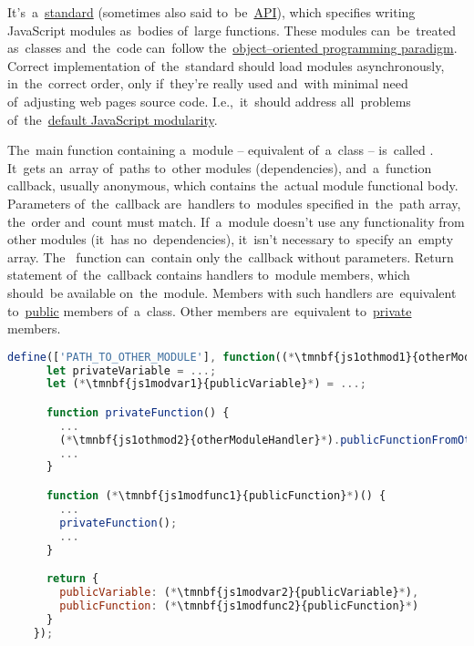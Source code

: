\label{amd}
It's~a~\hyperref[protocolstandard]{standard} (sometimes also said to~be~\hyperref[api]{API}), which specifies writing JavaScript modules as~bodies of~large functions.
These modules can~be~treated as~classes and~the~code can~follow the~\hyperref[objectorientedprogramming]{object--oriented programming paradigm}.
Correct implementation of~the~standard should load modules asynchronously, in~the~correct order, only if~they're really used and~with minimal need of~adjusting web pages source code.
I.e.,~it~should address all~problems of~the~\hyperref[javascriptmodularity]{default JavaScript modularity}.

\enlargethispage{20mm}
\thispagestyle{empty}
\label{amdsyntax}
The~main function containing a~module -- equivalent of~a~class -- is~called .
It~gets an~array of~paths to~other modules (dependencies), and~a~function callback, usually anonymous, which contains the~actual module functional body.
Parameters of~the~callback are~handlers to~modules specified in~the~path array, the~order and~count must match.
If~a~module doesn't use any functionality from other modules (it~has no~dependencies), it~isn't necessary to~specify an~empty array.
The~ function can~contain only the~callback without parameters.
Return statement of~the~callback contains handlers to~module members, which should~be available on~the~module.
Members with such handlers are~equivalent to~\hyperref[javapublic]{public} members of~a~class.
Other members are~equivalent to~\hyperref[javaprivate]{private} members.
\newpage

\begin{lstlisting}[language=JavaScript]
    define(['PATH_TO_OTHER_MODULE'], function((*\tmnbf{js1othmod1}{otherModuleHandler}*)) {
      let privateVariable = ...;
      let (*\tmnbf{js1modvar1}{publicVariable}*) = ...;

      function privateFunction() {
        ...
        (*\tmnbf{js1othmod2}{otherModuleHandler}*).publicFunctionFromOtherModule();
        ...
      }

      function (*\tmnbf{js1modfunc1}{publicFunction}*)() {
        ...
        privateFunction();
        ...
      }

      return {
        publicVariable: (*\tmnbf{js1modvar2}{publicVariable}*),
        publicFunction: (*\tmnbf{js1modfunc2}{publicFunction}*)
      }
    });
\end{lstlisting}


